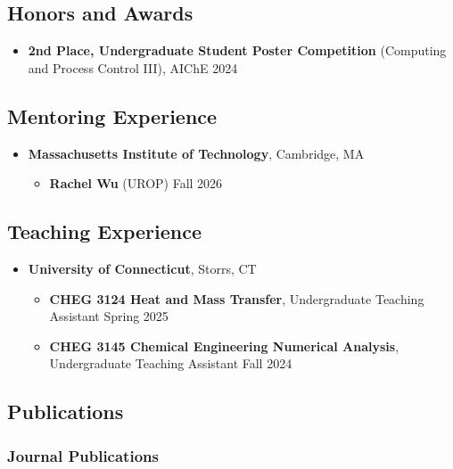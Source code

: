 \documentclass[letterpaper, 11pt]{article}
\begin{document}
\subsection*{Honors and Awards}
\begin{itemize}[leftmargin=*,itemsep=0pt]
\item[] \textbf{2nd Place, Undergraduate Student Poster Competition} (Computing and Process Control III), AIChE \hfill 2024
\end{itemize}

\subsection*{Mentoring Experience}
\begin{itemize}[itemsep=1pt, parsep=0pt,leftmargin=*]
  \item[] \textbf{Massachusetts Institute of Technology}, Cambridge, MA
    \begin{itemize}[itemsep=1pt, parsep=0pt,leftmargin=*]
    \item[] \textbf{Rachel Wu} (UROP) \hfill Fall 2026
  \end{itemize}
\end{itemize}

\subsection*{Teaching Experience}
\begin{itemize}[itemsep=1pt, parsep=0pt,leftmargin=*]
\item[] \textbf{University of Connecticut}, Storrs, CT
  \begin{itemize}[leftmargin=*,itemsep=0pt]
  \item[] \textbf{CHEG 3124 Heat and Mass Transfer}, Undergraduate Teaching Assistant \hfill Spring 2025
  \item[] \textbf{CHEG 3145 Chemical Engineering Numerical Analysis}, Undergraduate Teaching Assistant \hfill Fall 2024
  \end{itemize}
\end{itemize}

\subsection*{Publications}
\subsubsection*{Journal Publications}
\renewcommand*{\labelenumi}{[J\theenumi]}
\end{document}

